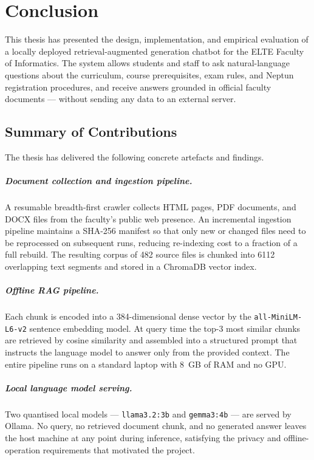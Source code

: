 \chapter{Conclusion}
\label{ch:sum}

This thesis has presented the design, implementation, and empirical evaluation of a locally deployed retrieval-augmented generation chatbot for the ELTE Faculty of Informatics. The system allows students and staff to ask natural-language questions about the curriculum, course prerequisites, exam rules, and Neptun registration procedures, and receive answers grounded in official faculty documents — without sending any data to an external server.

\section{Summary of Contributions}
\label{sec:sum-contributions}

The thesis has delivered the following concrete artefacts and findings.

\paragraph{Document collection and ingestion pipeline.}
A resumable breadth-first crawler collects HTML pages, PDF documents, and DOCX files from the faculty's public web presence. An incremental ingestion pipeline maintains a SHA-256 manifest so that only new or changed files need to be reprocessed on subsequent runs, reducing re-indexing cost to a fraction of a full rebuild. The resulting corpus of 482 source files is chunked into 6112 overlapping text segments and stored in a ChromaDB vector index.

\paragraph{Offline RAG pipeline.}
Each chunk is encoded into a 384-dimensional dense vector by the \texttt{all-MiniLM-L6-v2} sentence embedding model. At query time the top-3 most similar chunks are retrieved by cosine similarity and assembled into a structured prompt that instructs the language model to answer only from the provided context. The entire pipeline runs on a standard laptop with 8~GB of RAM and no GPU.

\paragraph{Local language model serving.}
Two quantised local models — \texttt{llama3.2:3b} and \texttt{gemma3:4b} — are served by Ollama. No query, no retrieved document chunk, and no generated answer leaves the host machine at any point during inference, satisfying the privacy and offline-operation requirements that motivated the project.

